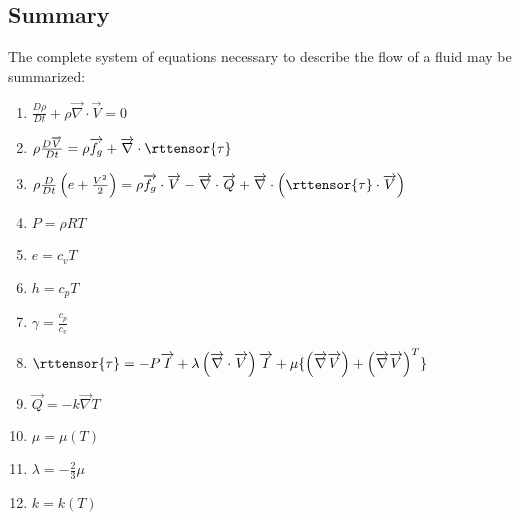\subsection{Summary}

The complete system of equations necessary to describe the flow of a fluid may
be summarized:

\begin{enumerate}
  \item{$
    \frac{D\rho}{Dt} 
    + \rho \overrightarrow{\nabla}\cdot\overrightarrow{V} = 0
  $}
  \item{$
    \rho\frac{D\overrightarrow{V}}{Dt} = 
    \rho\overrightarrow{f_g} 
    + \overrightarrow{\nabla}\cdot\rttensor{\tau} 
  $}
  \item{$
    \rho\frac{D}{Dt}\left(e + \frac{V^2}{2}\right) =
    \rho \overrightarrow{f_g}\cdot\overrightarrow{V}
    - \overrightarrow{\nabla}\cdot\overrightarrow{Q}
    + \overrightarrow{\nabla}\cdot\left(\rttensor{\tau}\cdot\overrightarrow{V}\right)
  $}
  \item{$P = \rho R T $}
  \item{$e = c_v T $}
  \item{$h = c_p T $}
  \item{$ \gamma = \frac{c_p}{c_v} $}
  \item{$
    \rttensor{\tau} = 
    - P\overrightarrow{I} 
    + \lambda\left(\overrightarrow{\nabla}\cdot\overrightarrow{V}\right)\overrightarrow{I}
    + \mu\{\left(\overrightarrow{\nabla}\overrightarrow{V}\right) 
    + \left(\overrightarrow{\nabla}\overrightarrow{V}\right)^T\}
  $}
  \item{$ \overrightarrow{Q} = -k \overrightarrow{\nabla}T $}
  \item{$ \mu = \mu(T) $}
  \item{$\lambda = -\frac{2}{3}\mu $}
  \item{$k = k(T) $}
\end{enumerate}


